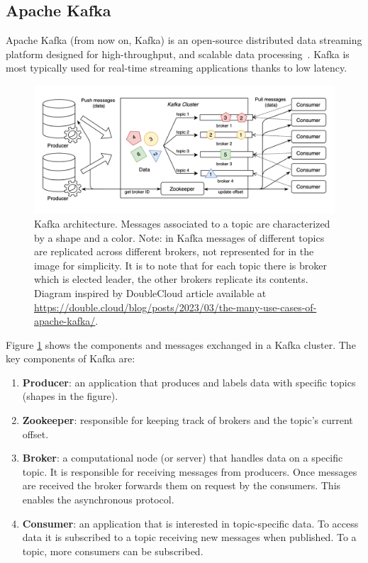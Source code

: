 \subsection{Apache Kafka}

Apache Kafka (from now on, Kafka) is an open-source distributed data streaming platform designed for high-throughput, and scalable data processing~\cite{krepsKafkaDistributedMessaging2011}. Kafka is most typically used for real-time streaming applications thanks to low latency. 

\begin{figure}[!ht]
    \begin{center}
      \includegraphics[width=\textwidth]{figures/2-background/kafka.png}
    \end{center}
    \caption[Kafka architecture]{Kafka architecture. Messages associated to a topic are characterized by a shape and a color. Note: in Kafka messages of different topics are replicated across different brokers, not represented for in the image for simplicity. It is to note that for each topic there is broker which is elected leader, the other brokers replicate its contents. Diagram inspired by DoubleCloud article available at \url{https://double.cloud/blog/posts/2023/03/the-many-use-cases-of-apache-kafka/}.}
    \label{fig:kafka}
\end{figure}

Figure \ref{fig:kafka} shows the components and messages exchanged in a Kafka cluster. The key components of Kafka are:
\begin{enumerate}
    \item \textbf{Producer}: an application that produces and labels data with specific topics (shapes in the figure).
    \item \textbf{Zookeeper}: responsible for keeping track of brokers and the topic's current offset.
    \item \textbf{Broker}: a computational node (or server) that handles data on a specific topic. It is responsible for receiving messages from producers. Once messages are received the broker forwards them on request by the consumers. This enables the asynchronous protocol.
    \item \textbf{Consumer}: an application that is interested in topic-specific data. To access data it is subscribed to a topic receiving new messages when published. To a topic, more consumers can be subscribed.
\end{enumerate}

